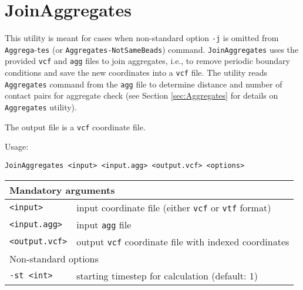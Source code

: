 \section{JoinAggregates} \label{sec:JoinAggregates}

This utility is meant for cases when non-standard option \texttt{-j} is
omitted from \texttt{Aggrega}-\texttt{tes} (or \texttt{Aggregates-NotSameBeads})
command. \texttt{JoinAggregates} uses the provided \texttt{vcf} and
\texttt{agg} files to join aggregates, i.e., to remove periodic boundary
conditions and save the new coordinates into a \texttt{vcf} file. The
utility reads \texttt{Aggregates} command from the \texttt{agg} file to
determine distance and number of contact pairs for aggregate check (see
Section \ref{sec:Aggregates} for details on \texttt{Aggregates} utility).

The output file is a \texttt{vcf} coordinate file.

Usage:

\vspace{1em}
\noindent
\texttt{JoinAggregates <input> <input.agg> <output.vcf> <options>}

\vspace{1em}
\noindent
\begin{longtable}{p{}p{}}
  \toprule
  \multicolumn{2}{l}{Mandatory arguments} \\
  \midrule
  \texttt{<input>} & input coordinate file (either \texttt{vcf} or
    \texttt{vtf} format) \\
  \texttt{<input.agg>} & input \texttt{agg} file \\
  \texttt{<output.vcf>} & output \texttt{vcf} coordinate file with indexed
    coordinates \\
  \toprule
  \multicolumn{2}{l}{Non-standard options} \\
  \midrule
  \texttt{-st <int>} & starting timestep for calculation (default: 1) \\
  \bottomrule
\end{longtable}

